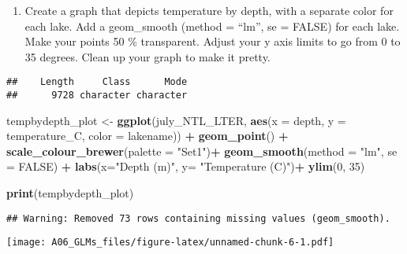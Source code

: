 \documentclass[]{article}
\newenvironment{Shaded}{\begin{snugshade}}{\end{snugshade}}
\newcommand{\KeywordTok}[1]{\textcolor[rgb]{0.13,0.29,0.53}{\textbf{#1}}}
\newcommand{\DataTypeTok}[1]{\textcolor[rgb]{0.13,0.29,0.53}{#1}}
\newcommand{\DecValTok}[1]{\textcolor[rgb]{0.00,0.00,0.81}{#1}}
\newcommand{\StringTok}[1]{\textcolor[rgb]{0.31,0.60,0.02}{#1}}
\newcommand{\CommentTok}[1]{\textcolor[rgb]{0.56,0.35,0.01}{\textit{#1}}}
\newcommand{\OtherTok}[1]{\textcolor[rgb]{0.56,0.35,0.01}{#1}}
\newcommand{\OperatorTok}[1]{\textcolor[rgb]{0.81,0.36,0.00}{\textbf{#1}}}
\newcommand{\NormalTok}[1]{#1}
\providecommand{\tightlist}{%
  \setlength{\itemsep}{0pt}\setlength{\parskip}{0pt}}
\begin{document}
\begin{enumerate}
\def\labelenumi{\arabic{enumi}.}
\setcounter{enumi}{15}
\tightlist
\item
  Create a graph that depicts temperature by depth, with a separate
  color for each lake. Add a geom\_smooth (method = ``lm'', se = FALSE)
  for each lake. Make your points 50 \% transparent. Adjust your y axis
  limits to go from 0 to 35 degrees. Clean up your graph to make it
  pretty.
\end{enumerate}

\begin{Shaded}
\end{Shaded}

\begin{verbatim}
##    Length     Class      Mode 
##      9728 character character
\end{verbatim}

\begin{Shaded}
\begin{Highlighting}[]
\NormalTok{tempbydepth_plot <-}\StringTok{ }\KeywordTok{ggplot}\NormalTok{(july_NTL_LTER, }\KeywordTok{aes}\NormalTok{(}\DataTypeTok{x =}\NormalTok{ depth, }\DataTypeTok{y =}\NormalTok{ temperature_C, }\DataTypeTok{color =}\NormalTok{ lakename)) }\OperatorTok{+}\StringTok{ }
\StringTok{  }\KeywordTok{geom_point}\NormalTok{() }\OperatorTok{+}\StringTok{ }
\StringTok{  }\KeywordTok{scale_colour_brewer}\NormalTok{(}\DataTypeTok{palette =} \StringTok{"Set1"}\NormalTok{)}\OperatorTok{+}
\StringTok{  }\KeywordTok{geom_smooth}\NormalTok{(}\DataTypeTok{method =} \StringTok{"lm"}\NormalTok{, }\DataTypeTok{se =} \OtherTok{FALSE}\NormalTok{) }\OperatorTok{+}
\StringTok{  }\KeywordTok{labs}\NormalTok{(}\DataTypeTok{x=}\StringTok{"Depth (m)"}\NormalTok{, }\DataTypeTok{y=} \StringTok{"Temperature (C)"}\NormalTok{)}\OperatorTok{+}
\StringTok{  }\KeywordTok{ylim}\NormalTok{(}\DecValTok{0}\NormalTok{, }\DecValTok{35}\NormalTok{)}

\KeywordTok{print}\NormalTok{(tempbydepth_plot)}
\end{Highlighting}
\end{Shaded}

\begin{verbatim}
## Warning: Removed 73 rows containing missing values (geom_smooth).
\end{verbatim}

\texttt{[image: A06\_GLMs\_files/figure-latex/unnamed-chunk-6-1.pdf]}
\end{document}
